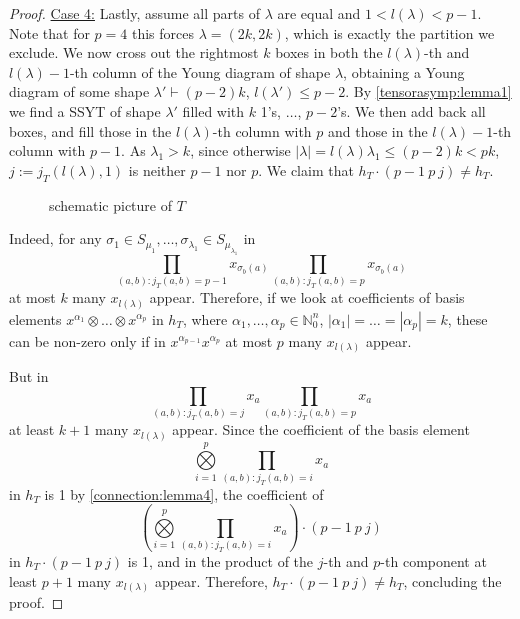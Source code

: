 \documentclass[a4paper]{amsart}
\def\N{{\mathbb{N}}}
\newcommand{\abs}[1]{\left| #1\right|}
\begin{document}
\begin{proof}
	\underline{Case 4:} Lastly, assume all parts of $\lambda$ are equal and $1<l(\lambda)<p-1$.
	Note that for $p=4$ this forces $\lambda=(2k,2k)$, which is exactly the partition we exclude.
	We now cross out the rightmost $k$ boxes in both the $l(\lambda)$-th and $l(\lambda)-1$-th column of the Young diagram of shape $\lambda$,
	 obtaining a Young diagram of some shape $\lambda'\vdash (p-2)k$, $l(\lambda')\leq p-2$.
	By \cref{tensorasymp:lemma1} we find a SSYT of shape $\lambda'$ filled with $k$ 1's, $\ldots$, $p-2$'s.
	We then add back all boxes, and fill those in the $l(\lambda)$-th column with $p$ and those in the $l(\lambda)-1$-th column with $p-1$.
	As $\lambda_1>k$,
	since otherwise $\abs{\lambda}=l(\lambda)\lambda_1\leq(p-2)k<pk$,
	$j:=j_T(l(\lambda),1)$ is neither $p-1$ nor $p$.
	We claim that $h_T\cdot(p-1\ p\ j)\neq h_T$.
	\begin{figure}[H]
		\centering
		\caption*{schematic picture of $T$}
	\end{figure}
	
	Indeed, for any $\sigma_1\in S_{\mu_1}, \ldots, \sigma_{\lambda_1}\in S_{\mu_{\lambda_1}}$ in
	\begin{displaymath}
		\prod\limits_{(a,b):j_T(a,b)=p-1}x_{\sigma_b(a)}\prod\limits_{(a,b):j_T(a,b)=p}x_{\sigma_b(a)}
	\end{displaymath}
	at most $k$ many $x_{l(\lambda)}$ appear.
	Therefore,
	if we look at coefficients of basis elements $x^{\alpha_1}\otimes\ldots\otimes x^{\alpha_p}$ in $h_T$, where $\alpha_1,\ldots,\alpha_p\in\N_0^n$, $\abs{\alpha_1}=\ldots=\abs{\alpha_p}=k$,
	these can be non-zero only if in $x^{\alpha_{p-1}}x^{\alpha_{p}}$ at most $p$ many $x_{l(\lambda)}$ appear.
	
	But in
	\begin{displaymath}
		\prod\limits_{(a,b):j_T(a,b)=j}x_a\prod\limits_{(a,b):j_T(a,b)=p}x_a
	\end{displaymath}
	at least $k+1$ many $x_{l(\lambda)}$ appear.
	Since the coefficient of the basis element
	\begin{displaymath}
		\bigotimes\limits_{i=1}^p\prod\limits_{(a,b):j_T(a,b)=i}x_{a}
	\end{displaymath}
	in $h_T$ is 1 by \cref{connection:lemma4},
	the coefficient of
	\begin{displaymath}
		\left(\bigotimes\limits_{i=1}^p\prod\limits_{(a,b):j_T(a,b)=i}x_{a}\right)\cdot (p-1\ p\ j)
	\end{displaymath}
	in $h_T\cdot(p-1\ p\ j)$  is 1,
	and in the product of the $j$-th and $p$-th component at least $p+1$ many $x_{l(\lambda)}$ appear.
	Therefore, $h_T\cdot(p-1\ p\ j)\neq h_T$,
	concluding the proof.
\end{proof}
\end{document}
